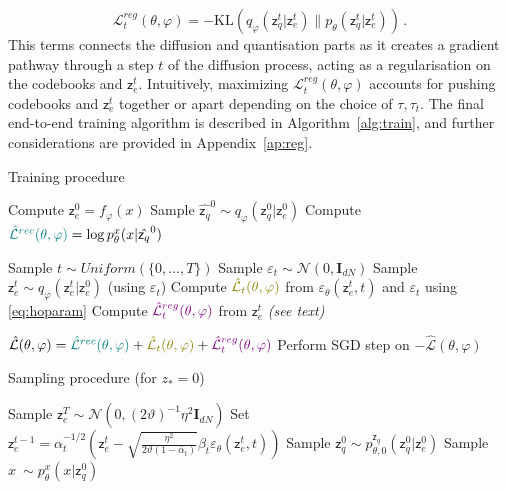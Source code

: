 \documentclass[nolayout]{article}
\theoremstyle{plain}
\theoremstyle{definition}
\theoremstyle{remark}
\newcommand{\latentcont}{\mathsf{z}_e}
\newcommand{\latentdis}{\mathsf{z}_q}
\begin{document}
\begin{equation}
    \mathcal{L}^{reg}_t(\theta,\varphi) = -\mathrm{KL}(q_\varphi(\latentdis^{t}|\latentcont^{t})\|p_\theta(\latentdis^{t}|\latentcont^{t}))\,. 
\end{equation}
This terms connects the diffusion and quantisation parts as it creates a gradient pathway through a step $t$ of the diffusion process, acting as a regularisation on the codebooks and $\latentcont^t$. Intuitively, maximizing $\mathcal{L}^{reg}_t(\theta,\varphi)$  accounts for pushing codebooks and $\latentcont^t$ together or apart depending on the choice of $\tau, \tau_t$. The final end-to-end training algorithm is described in Algorithm~\ref{alg:train}, and further considerations are provided  in Appendix~\ref{ap:reg}.


\begin{algorithm}[tb]
   \caption{Training procedure}
   \label{alg:train}
\begin{algorithmic}
   \REPEAT
   

   \STATE Compute $\latentcont^0= f_\varphi(x)$ 
   \STATE Sample $\hat{\latentdis}^0 \sim q_\varphi(\latentdis^0|\latentcont^0)$
   \STATE Compute $\textcolor{teal}{\hat{\mathcal{L}}^{rec}(\theta,\varphi)} = \log p^x_{\theta}(x|\hat{\latentdis}^0)$ 

   \STATE Sample $t \sim Uniform(\{0,\ldots, T\})$ 
   \STATE Sample $\varepsilon_t \sim \mathcal{N}(0,\mathbf{I}_{dN})$
   \STATE Sample $\latentcont^{t} \sim q_\varphi(\latentcont^t|\latentcont^0)$ (using $\varepsilon_t$)
   \STATE Compute $\textcolor{olive}{\hat{\mathcal{L}}_t(\theta,\varphi)}$ from $\varepsilon_\theta(\latentcont^{t},t)$ and $\varepsilon_t$ using \eqref{eq:hoparam}
   \STATE Compute $\textcolor{violet}{\hat{\mathcal{L}}^{reg}_t(\theta,\varphi)}$ from $\latentcont^{t}$ \textit{(see text)}

   \STATE $\hat{\mathcal{L}}(\theta,\varphi) = \textcolor{teal}{\hat{\mathcal{L}}^{rec}(\theta,\varphi)} + \textcolor{olive}{\hat{\mathcal{L}}_t(\theta,\varphi)} + \textcolor{violet}{\hat{\mathcal{L}}^{reg}_t(\theta,\varphi)}$
   \STATE Perform SGD step on $-\hat{\mathcal{L}}(\theta,\varphi)$
\end{algorithmic}
\end{algorithm}

\begin{algorithm}[tb]
   \caption{Sampling procedure (for $z_* = 0$)}
   \label{alg:sample}
\begin{algorithmic}
   
   \STATE Sample $\latentcont^T \sim \mathcal{N}(0, (2\vartheta)^{-1}\eta^2 \mathbf{I}_{dN})$ 
   \STATE Set $\latentcont^{t-1} = \alpha_t^{-1/2}\left(\latentcont^t - \sqrt{\frac{\eta^2}{2\vartheta (1-\bar{\alpha}_t)}}\beta_t\varepsilon_\theta(\latentcont^{t},t)\right)$
   \ENDFOR
   \STATE  Sample $\latentdis^0 \sim  p^{\latentdis}_{\theta,0}(\latentdis^0|\latentcont^0)$ 
   \STATE Sample $x ~ \sim  p^x_{\theta}(x|\latentdis^0)$ 
\end{algorithmic}
\end{algorithm}
\end{document}
